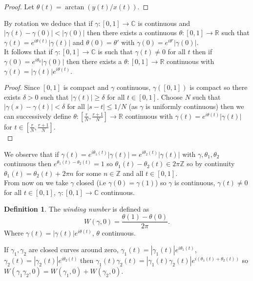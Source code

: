\documentclass[a4paper, 10pt, twocolumn]{amsart}
\theoremstyle{definition}
\newtheorem*{definition}{Definition}
\newcommand{\bb}[1]{\mathbb{#1}}
\newcommand{\1}{\mathbbm{1}}
\begin{document}
\begin{proof}
    Let $\theta(t) = \arctan(y(t)/x(t))$.
\end{proof}

By rotation we deduce that if $\gamma:[0,1] \to \bb{C}$ is continuous and $|\gamma(t)-\gamma(0)| < |\gamma(0)|$ then there exists a continuous $\theta:[0,1] \to \bb{R}$ such that $\gamma(t) = e^{i\theta(t)}|\gamma(t)|$ and $\theta(0) = \theta'$ with $\gamma(0) = e^{i\theta'}|\gamma(0)|$. \\

It follows that if $\gamma:[0,1] \to \bb{C}$ is such that $\gamma(t) \ne 0$ for all $t$ then if $\gamma(0) = e^{i\theta_0} |\gamma(0)|$ then there exists a $\theta:[0,1] \to \bb{R}$ continuous with $\gamma(t) = |\gamma(t)|e^{i\theta(t)}$.

\begin{proof}
    Since $[0,1]$ is compact and $\gamma$ continuous, $\gamma([0,1])$ is compact so there exists $\delta>0$ such that $|\gamma(t)| \ge \delta$ for all $t \in [0,1]$. Choose $N$ such that $|\gamma(s)-\gamma(t)| < \delta$ for all $|s-t|\le 1/N$ (as $\gamma$ is uniformly continuous) then we can successively define $\theta: [\frac{r}{N},\frac{r+1}{N}] \to \bb{R}$ continuous with $\gamma(t) = e^{i\theta(t)}|\gamma(t)|$ for $t \in [\frac{r}{N},\frac{r+1}{N}]$.\\
\end{proof}

We observe that if $\gamma(t) = e^{i\theta_1(t)}|\gamma(t)| = e^{i\theta_2(t)}|\gamma(t)|$ with $\gamma,\theta_1,\theta_2$ continuous then $e^{\theta_1(t)-\theta_2(t)} = 1$ so $\theta_1(t)-\theta_2(t) \in 2\pi\bb{Z}$ so by continuity $\theta_1(t) = \theta_2(t) + 2\pi n$ for some $n \in \bb{Z}$ and all $t\in [0,1]$.\\

From now on we take $\gamma$ closed (i.e $\gamma(0) = \gamma(1)$) so $\gamma$ is continuous, $\gamma(t) \ne 0$ for all $t\in [0,1]$, $\gamma:[0,1] \to \bb{C}$ continuous. 

\begin{definition}
    The \textit{winding number} is defined as \[W(\gamma,0) = \frac{\theta(1)-\theta(0)}{2\pi}.\]
    Where $\gamma(t) = |\gamma(t)|e^{i\theta(t)}$, $\theta$ continuous. 
\end{definition}
If $\gamma_1,\gamma_2$ are closed curves around zero, $\gamma_1(t) = |\gamma_1(t)|e^{i\theta_1(t)}$, $\gamma_2(t) = |\gamma_2(t)|e^{i\theta_2(t)}$ then $\gamma_1(t)\gamma_2(t) = |\gamma_1(t)\gamma_2(t)|e^{i(\theta_1(t)+\theta_2(t))}$ so $W(\gamma_1\gamma_2,0) = W(\gamma_1,0)+W(\gamma_2,0)$. \\
\end{document}
